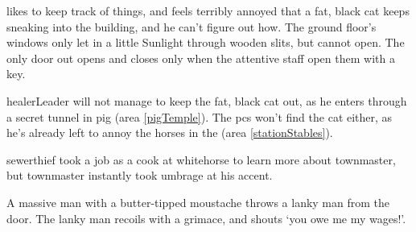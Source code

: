 \begin{multicols}{2}
 likes to keep track of things, and feels terribly annoyed that a fat, black cat keeps sneaking into the building, and he can't figure out how.
The ground floor's windows only let in a little Sunlight through wooden slits, but cannot open.
The only door out opens and closes only when the attentive staff open them with a key.

\Gls{healerLeader} will not manage to keep the fat, black cat out, as he enters through a secret tunnel in \gls{pig} (area \vref{pigTemple}).
The \glspl{pc} won't find the cat either, as he's already left to annoy the horses in the  (area \vref{stationStables}).

\healerLeader


\begin{exampletext}
  \Gls{sewerthief} took a job as a cook at \gls{whitehorse} to learn more about \gls{townmaster}, but \gls{townmaster} instantly took umbrage at his  accent.
\end{exampletext}

\begin{boxtext}
  A massive man with a butter-tipped moustache throws a lanky man from the door.
  The lanky man recoils with a grimace, and shouts `you owe me my wages!'.
\end{boxtext}




\end{multicols}
